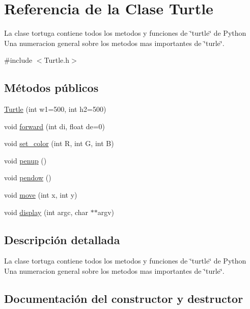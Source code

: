 \hypertarget{classTurtle}{}\section{Referencia de la Clase Turtle}
\label{classTurtle}


La clase tortuga contiene todos los metodos y funciones de \char`\"{}turtle\char`\"{} de Python  Una numeracion general sobre los metodos mas importantes de \char`\"{}turle\char`\"{}.  




{\ttfamily \#include $<$Turtle.\+h$>$}

\subsection*{Métodos públicos}
\begin{DoxyCompactItemize}
\item 
\hyperlink{classTurtle_a1bb2294aefb24529b2d35a84c2339027}{Turtle} (int w1=500, int h2=500)
\item 
void \hyperlink{classTurtle_acf384dcc28f8f002c0134a9a13567d36}{forward} (int di, float de=0)
\item 
void \hyperlink{classTurtle_ad4f1cfec231a2d91c529d20c2331168b}{set\+\_\+color} (int R, int G, int B)
\item 
void \hyperlink{classTurtle_a40367ef16bd84c7d382992b8e6d3a9fc}{penup} ()
\item 
void \hyperlink{classTurtle_aabe573f505a789dfe84fc2219ec0cb10}{pendow} ()
\item 
void \hyperlink{classTurtle_ac77d9bd08853112cccfc27962fef4759}{move} (int x, int y)
\item 
void \hyperlink{classTurtle_ae62d0d6d90add2c86baa14ae01cdbe4a}{display} (int argc, char $\ast$$\ast$argv)
\end{DoxyCompactItemize}


\subsection{Descripción detallada}
La clase tortuga contiene todos los metodos y funciones de \char`\"{}turtle\char`\"{} de Python  Una numeracion general sobre los metodos mas importantes de \char`\"{}turle\char`\"{}. 

\subsection{Documentación del constructor y destructor}
\mbox{\label{classTurtle_a1bb2294aefb24529b2d35a84c2339027}} 
